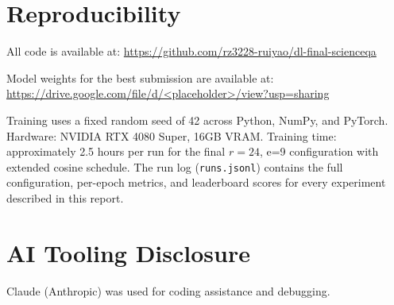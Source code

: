 \documentclass[11pt]{article}
\begin{document}
\section*{Reproducibility}

All code is available at: \url{https://github.com/rz3228-ruiyao/dl-final-scienceqa}

Model weights for the best submission are available at: \url{https://drive.google.com/file/d/<placeholder>/view?usp=sharing}

\noindent Training uses a fixed random seed of 42 across Python, NumPy, and PyTorch. Hardware: NVIDIA RTX 4080 Super, 16GB VRAM. Training time: approximately 2.5 hours per run for the final $r{=}24$, e=9 configuration with extended cosine schedule. The run log (\texttt{runs.jsonl}) contains the full configuration, per-epoch metrics, and leaderboard scores for every experiment described in this report.

\section*{AI Tooling Disclosure}

Claude (Anthropic) was used for coding assistance and debugging.
\end{document}
